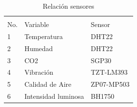     \begin{table}[H]
        \centering
        \caption{Relación sensores}
        \label{tab:relacion_sensores}
        \begin{tabular}{|l|l|l|}
        \hline
        \cellcolor[HTML]{9698ED}                      & \cellcolor[HTML]{9698ED}                           & \cellcolor[HTML]{9698ED}                         \\
        \multirow{-2}{*}{\cellcolor[HTML]{9698ED}No.} & \multirow{-2}{*}{\cellcolor[HTML]{9698ED}Variable} & \multirow{-2}{*}{\cellcolor[HTML]{9698ED}Sensor} \\ \hline
        1                                             & Temperatura                                        & DHT22                                            \\ \hline
        2                                             & Humedad                                            & DHT22                                            \\ \hline
        3                                             & CO2                                                & SGP30                                            \\ \hline
        4                                             & Vibración                                          & TZT-LM393                                        \\ \hline
        5                                             & Calidad de Aire                                    & ZP07-MP503                                       \\ \hline
        6                                             & Intensidad luminosa                                & BH1750                                           \\ \hline
        \end{tabular}
    \end{table}


